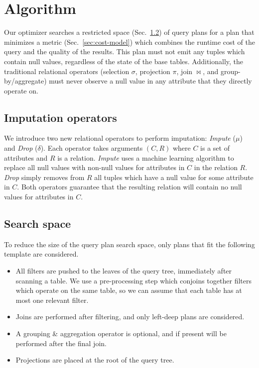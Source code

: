 \section{Algorithm}

Our optimizer searches a restricted space (Sec.~\ref{sec:search-space}) of query plans for a plan that minimizes a metric (Sec.~\ref{sec:cost-model}) which combines the runtime cost of the query and the quality of the results.
This plan must not emit any tuples which contain null values, regardless of the state of the base tables.
Additionally, the traditional relational operators (selection $\sigma$, projection $\pi$, join $\bowtie$, and group-by/aggregate) must never observe a null value in any attribute that they directly operate on.

\subsection{Imputation operators}
We introduce two new relational operators to perform imputation: \textit{Impute} ($\mu$) and
\textit{Drop} ($\delta$). Each operator takes arguments $(C, R)$ where $C$ is a set of
attributes and $R$ is a relation. \textit{Impute} uses a machine learning algorithm to
replace all null values with non-null values for attributes in $C$ in the relation $R$.
\textit{Drop} simply removes from $R$ all tuples which have a null value for some attribute in $C$.
Both operators guarantee that the resulting relation will contain no null values for
attributes in $C$.  

\subsection{Search space}
\label{sec:search-space}
To reduce the size of the query plan search space, only plans that fit the following template are considered.

\begin{itemize}
\item All filters are pushed to the leaves of the query tree, immediately after scanning a table. We use a pre-processing step which conjoins together filters which operate on the same table, so we can assume that each table has at most one relevant filter.

\item Joins are performed after filtering, and only left-deep plans are considered.

\item A grouping \& aggregation operator is optional, and if present will be performed after the final join.

\item Projections are placed at the root of the query tree.
\end{itemize}
  
